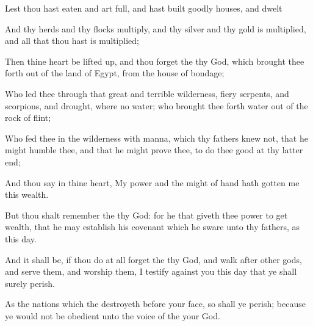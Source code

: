 {Lest
{} thou hast
eaten and art
full, and hast
built
goodly
houses, and
dwelt
{}

And
{} thy
herds and thy
flocks
multiply, and thy
silver and thy
gold is
multiplied, and all that thou hast is
multiplied;

Then thine
heart be lifted
up, and thou
forget the
{} thy
God, which brought thee
forth out of the
land of
Egypt, from the
house of
bondage;

Who
led thee through that
great and
terrible
wilderness,
{}
fiery
serpents, and
scorpions, and
drought, where
{} no
water; who brought thee
forth
water out of the
rock of
flint;

Who
fed thee in the
wilderness with
manna, which thy
fathers
knew not, that he might
humble thee, and that he might
prove thee, to do thee
good at thy latter
end;

And thou
say in thine
heart, My
power and the
might of
{}
hand hath
gotten me this
wealth.

But thou shalt
remember the
{} thy
God: for
{} he that
giveth thee
power to
get
wealth, that he may
establish his
covenant which he
sware unto thy
fathers, as
{} this
day.

And it shall be, if thou do at
all
forget the
{} thy
God, and
walk
after
other
gods, and
serve them, and
worship them, I
testify against you this
day that ye shall
surely
perish.

As the
nations which the
{}
destroyeth before your
face, so shall ye
perish;
because ye would not be
obedient unto the
voice of the
{} your
God.




\par }
